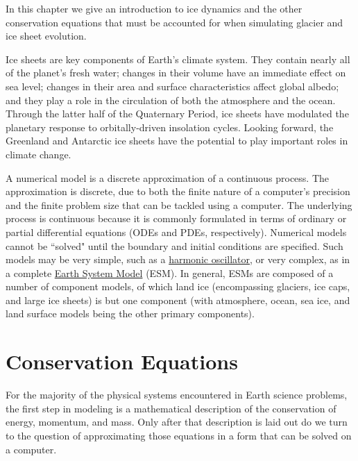 \label{ch:modelingintro}

In this chapter we give an introduction to ice dynamics and the other conservation equations
that must be accounted for when simulating glacier and ice sheet evolution.

Ice sheets are key components of Earth's climate system. They contain
nearly all of the planet's fresh water; changes in their volume have an
immediate effect on sea level; changes in their area and surface
characteristics affect global albedo; and they play a role in the
circulation of both the atmosphere and the ocean. Through the latter
half of the Quaternary Period, ice sheets have modulated the planetary response
to orbitally-driven insolation cycles. Looking forward, the Greenland
and Antarctic ice sheets have the potential to play important roles in
climate change.

A numerical model is a discrete approximation of a continuous process.
The approximation is discrete, due to both the finite nature of a computer's
precision and the finite problem size that can be tackled using a computer. 
The underlying process is continuous because it is commonly
formulated in terms of ordinary or partial differential equations (ODEs and PDEs,
respectively). Numerical models cannot be ``solved" until the boundary and
initial conditions are specified. Such models may be very simple, such as
a \href{http://en.wikipedia.org/wiki/Harmonic_oscillator}{harmonic oscillator},
or very complex, as in a complete \href{http://en.wikipedia.org/wiki/General_Circulation_Model}
{Earth System Model} (ESM). In general, ESMs are composed of a number of component
models, of which land ice (encompassing glaciers, ice caps, and large ice sheets) is but one
component (with atmosphere, ocean, sea ice, and land surface models being the other
primary components).   


\section{Conservation Equations}

For the majority of the physical systems encountered in Earth science problems, the first step in modeling is a
mathematical description of the conservation of energy, momentum, and mass. Only after that description is
laid out do we turn to the question of approximating those equations in a form that can be solved on a computer. 


